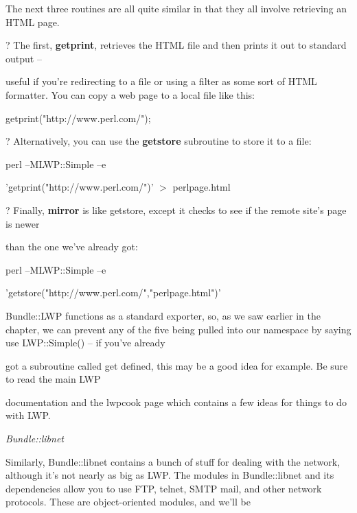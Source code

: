 \documentclass[a4paper,11pt]{book}
\begin{document}
\noindent 

\noindent The next three routines are all quite similar in that they all involve retrieving an HTML page.

\noindent 

\noindent ? The first, \textbf{getprint}, retrieves the HTML file and then prints it out to standard output --

\noindent useful if you're redirecting to a file or using a filter as some sort of HTML formatter. You can copy a web page to a local file like this:

\noindent 

\noindent getprint("http://www.perl.com/");

\noindent 

\noindent ? Alternatively, you can use the \textbf{getstore }subroutine to store it to a file:

\noindent 

\noindent perl --MLWP::Simple --e

\noindent 'getprint("http://www.perl.com/")' $>$ perlpage.html

\noindent 

\noindent 

\noindent ? Finally, \textbf{mirror }is like getstore, except it checks to see if the remote site's page is newer

\noindent than the one we've already got:

\noindent 

\noindent perl --MLWP::Simple --e

\noindent 'getstore("http://www.perl.com/","perlpage.html")'

\noindent 

\noindent Bundle::LWP functions as a standard exporter, so, as we saw earlier in the chapter, we can prevent any of the five being pulled into our namespace by saying use LWP::Simple() -- if you've already

\noindent got a subroutine called get defined, this may be a good idea for example. Be sure to read the main LWP

\noindent documentation and the lwpcook page which contains a few ideas for things to do with LWP.

\noindent 

\noindent \textit{Bundle::libnet}

\noindent Similarly, Bundle::libnet contains a bunch of stuff for dealing with the network, although it's not nearly as big as LWP. The modules in Bundle::libnet and its dependencies allow you to use FTP, telnet, SMTP mail, and other network protocols. These are object-oriented modules, and we'll be
\end{document}

